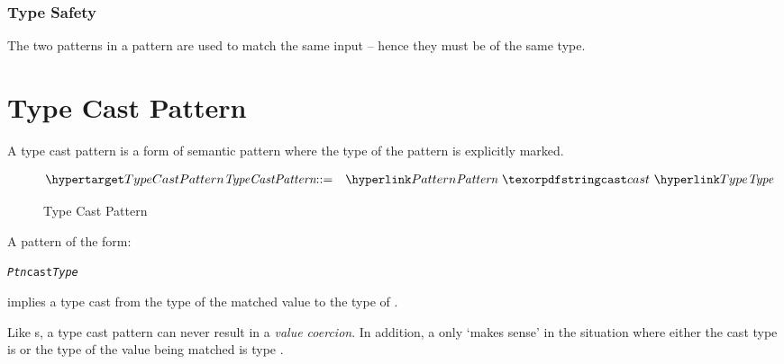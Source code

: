\subsubsection{Type Safety}
The two patterns in a  pattern are used to match the same input -- hence they must be of the same type.

\section{Type Cast Pattern}
\label{typeCastPattern}

A type cast pattern is a form of semantic pattern where the type of the pattern is explicitly marked.

\begin{figure}[htbp]
\begin{eqnarray*}
\ntDef{TypeCastPattern}&\arrow&\ntRef{Pattern}\ \q{cast}\ \ntRef{Type}
\end{eqnarray*}
\caption{Type Cast Pattern}
\label{typeCastPtnFig}
\end{figure}

A pattern of the form:
\begin{alltt}
\emph{Ptn} cast \emph{Type}
\end{alltt}
implies a type cast from the type of the matched value to the type of .

\begin{aside}
Like s, a type cast pattern can never result in a \emph{value coercion}. In addition, a  only `makes sense' in the situation where either the cast type is  or the type of the value being matched is type .
\end{aside}

%
%

